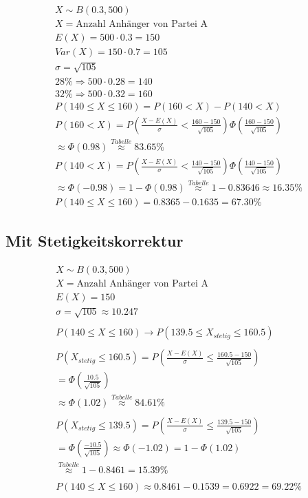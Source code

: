 \begin{align*}
    X \sim B(0.3, 500) \\
    X = \text{Anzahl Anhänger von Partei A} \\
    E(X) = 500 \cdot 0.3 = 150 \\
    Var(X) = 150 \cdot 0.7 = 105 \\
    \sigma = \sqrt{105}\\
    28\% \Rightarrow 500 \cdot 0.28 = 140 \\
    32\% \Rightarrow 500 \cdot 0.32 = 160 \\
    P(140 \leq X \leq 160) = P(160 < X) - P(140 < X) \\
    P(160 < X) = P\left(\frac{X - E(X)}{\sigma} < \frac{160 - 150}{\sqrt{105}}\right)
    \Phi\left(\frac{160 - 150}{\sqrt{105}}\right) \\
    \approx \Phi(0.98) \overset{Tabelle}{\approx} 83.65 \%\\
    P(140 < X) = P\left(\frac{X - E(X)}{\sigma} < \frac{140 - 150}{\sqrt{105}}\right)
    \Phi\left(\frac{140 - 150}{\sqrt{105}}\right) \\
    \approx \Phi(-0.98) = 1 - \Phi(0.98) \overset{Tabelle}{\approx} 1 - 0.83646 \approx 16.35\% \\
    P(140 \leq X \leq 160) = 0.8365 - 0.1635 = 67.30\%
\end{align*}

\subsection{Mit Stetigkeitskorrektur}

\begin{align*}
    X \sim B(0.3, 500) \\
    X = \text{Anzahl Anhänger von Partei A} \\
    E(X) = 150 \\
    \sigma = \sqrt{105} \approx 10.247 \\
    \\
    P(140 \leq X \leq 160) \rightarrow P(139.5 \leq X_{stetig} \leq 160.5) \\
    \\
    P(X_{stetig} \leq 160.5) = P\left(\frac{X - E(X)}{\sigma} \leq \frac{160.5 - 150}{\sqrt{105}}\right) \\
    = \Phi\left(\frac{10.5}{\sqrt{105}}\right) \\
    \approx \Phi(1.02) \overset{Tabelle}{\approx} 84.61 \% \\
    \\
    P(X_{stetig} \leq 139.5) = P\left(\frac{X - E(X)}{\sigma} \leq \frac{139.5 - 150}{\sqrt{105}}\right) \\
    = \Phi\left(\frac{-10.5}{\sqrt{105}}\right) \approx \Phi(-1.02) = 1 - \Phi(1.02) \\
    \overset{Tabelle}{\approx} 1 - 0.8461 = 15.39 \% \\
    \\
    P(140 \leq X \leq 160) \approx 0.8461 - 0.1539 = 0.6922 = 69.22\%
\end{align*}

